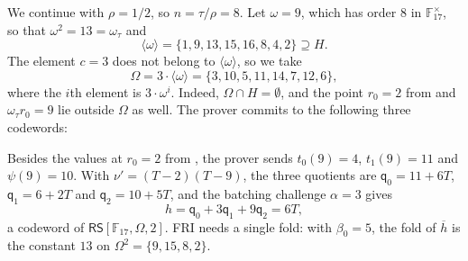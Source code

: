 \documentclass[../../book]{subfiles}
\begin{document}
\begin{example}\label{ex:stark-fibsq-6}
  We continue  with $\rho = 1/2$, so $n = \tau / \rho = 8$.
  Let $\omega = 9$, which has order $8$ in $\mathbb{F}_{17}^\times$, so that $\omega^2 = 13 = \omega_\tau$ and
  \begin{equation*}
    \langle \omega \rangle = \{1, 9, 13, 15, 16, 8, 4, 2\} \supseteq H.
  \end{equation*}
  The element $c = 3$ does not belong to $\langle \omega \rangle$, so we take
  \begin{equation*}
    \Omega = 3 \cdot \langle \omega \rangle = \{3, 10, 5, 11, 14, 7, 12, 6\},
  \end{equation*}
  where the $i$th element is $3 \cdot \omega^i$.
  Indeed, $\Omega \cap H = \emptyset$, and the point $r_0 = 2$ from  and $\omega_\tau r_0 = 9$ lie outside $\Omega$ as well.
  The prover commits to the following three codewords:
  \begin{center}
  \end{center}
  Besides the values at $r_0 = 2$ from , the prover sends $t_0(9) = 4$, $t_1(9) = 11$ and $\psi(9) = 10$.
  With $\nu' = (T - 2)(T - 9)$, the three quotients are $\mathsf{q}_0 = 11 + 6T$, $\mathsf{q}_1 = 6 + 2T$ and $\mathsf{q}_2 = 10 + 5T$, and the batching challenge $\alpha = 3$ gives
  \begin{equation*}
    h = \mathsf{q}_0 + 3 \mathsf{q}_1 + 9 \mathsf{q}_2 = 6T,
  \end{equation*}
  a codeword of $\mathsf{RS}[\mathbb{F}_{17}, \Omega, 2]$.
  FRI needs a single fold: with $\beta_0 = 5$, the fold of $\overline{h}$ is the constant $13$ on $\Omega^2 = \{9, 15, 8, 2\}$.
\end{example}
\end{document}
